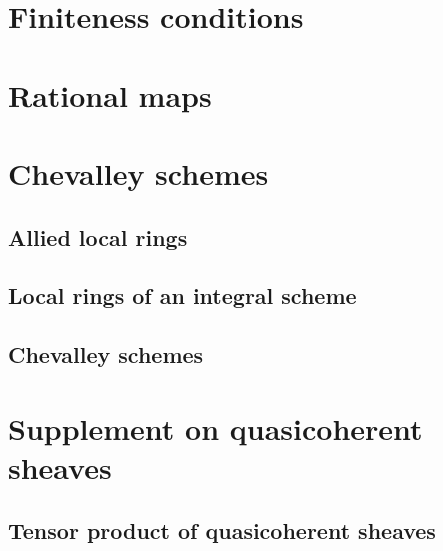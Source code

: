\documentclass{book}
\begin{document}
    \section{Finiteness conditions}



    \section{Rational maps}



    \section{Chevalley schemes}



        \subsection{Allied local rings}

        



        \subsection{Local rings of an integral scheme}

        



        \subsection{Chevalley schemes}

        



    \section{Supplement on quasicoherent sheaves}



        \subsection{Tensor product of quasicoherent sheaves}

        
\end{document}

